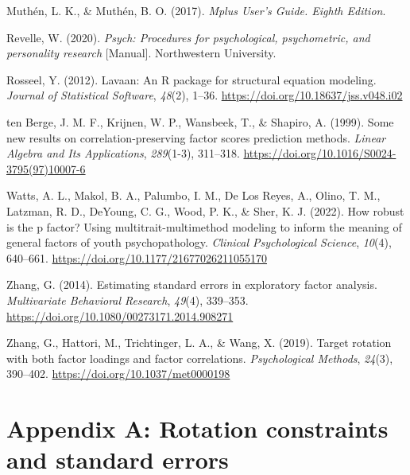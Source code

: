 \documentclass[
  12pt,
  letterpaper,
  article]{scrartcl}
\newlength{\cslhangindent}
\newenvironment{CSLReferences}[2] %
 {\begin{list}{}{%
  \setlength{\itemindent}{0pt}
  \setlength{\leftmargin}{0pt}
  \setlength{\parsep}{0pt}
  \ifodd #1
   \setlength{\leftmargin}{\cslhangindent}
   \setlength{\itemindent}{-1\cslhangindent}
  \fi
  \setlength{\itemsep}{#2\baselineskip}}}
 {\end{list}}
\begin{document}
\begin{CSLReferences}{1}{0}
Muthén, L. K., \& Muthén, B. O. (2017). \emph{Mplus {User}'s {Guide}.
{Eighth Edition}}.

Revelle, W. (2020). \emph{Psych: {Procedures} for psychological,
psychometric, and personality research} {[}Manual{]}. Northwestern
University.

Rosseel, Y. (2012). Lavaan: {An R} package for structural equation
modeling. \emph{Journal of Statistical Software}, \emph{48}(2), 1--36.
\url{https://doi.org/10.18637/jss.v048.i02}

{ten Berge, J. M. F., Krijnen, W. P., Wansbeek, T., \& Shapiro, A.}
(1999). Some new results on correlation-preserving factor scores
prediction methods. \emph{Linear Algebra and Its Applications},
\emph{289}(1-3), 311--318.
\url{https://doi.org/10.1016/S0024-3795(97)10007-6}

Watts, A. L., Makol, B. A., Palumbo, I. M., De Los Reyes, A., Olino, T.
M., Latzman, R. D., DeYoung, C. G., Wood, P. K., \& Sher, K. J. (2022).
How robust is the p factor? {Using} multitrait-multimethod modeling to
inform the meaning of general factors of youth psychopathology.
\emph{Clinical Psychological Science}, \emph{10}(4), 640--661.
\url{https://doi.org/10.1177/21677026211055170}

Zhang, G. (2014). Estimating standard errors in exploratory factor
analysis. \emph{Multivariate Behavioral Research}, \emph{49}(4),
339--353. \url{https://doi.org/10.1080/00273171.2014.908271}

Zhang, G., Hattori, M., Trichtinger, L. A., \& Wang, X. (2019). Target
rotation with both factor loadings and factor correlations.
\emph{Psychological Methods}, \emph{24}(3), 390--402.
\url{https://doi.org/10.1037/met0000198}

\end{CSLReferences}

\newpage

\appendix

\section*{Appendix A: Rotation constraints and standard
errors}\label{appendix-a-rotation-constraints-and-standard-errors}
\end{document}
